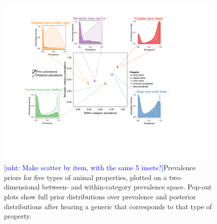 \documentclass[10pt,letterpaper]{article}
\newcommand{\mht}[1]{\textcolor{Blue}{[mht: #1]}}
\begin{document}


\begin{figure}
\centering
    \includegraphics[width=1\columnwidth]{prevalence-asymmetry-scatterwDists.pdf}
    \caption{\mht{Make scatter by item, with the same 5 insets?}Prevalence priors for five types of animal properties, plotted on a two-dimensional between- and within-category prevalence space. 
    Pop-out plots show full prior distributions over prevalence and posterior distributions after hearing a generic that corresponds to that type of property. }
  \label{fig:prior2}
\end{figure}
\end{document}
